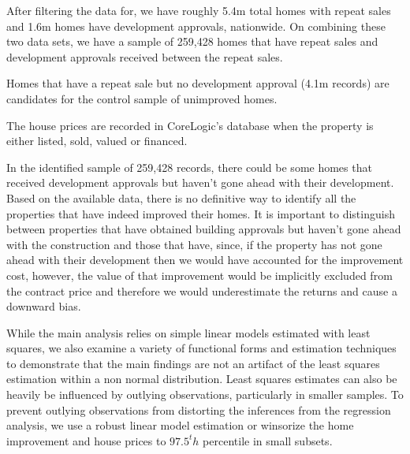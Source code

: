 %


After filtering the data for,   we have roughly 5.4m total homes with repeat sales and 1.6m homes have development approvals, nationwide. On combining these two data sets, we have a sample of 259,428 homes that have repeat sales and development approvals received between the repeat sales. 

Homes that have a repeat sale but no development approval (4.1m records) are candidates for the control sample of unimproved homes.


 The house prices are recorded in CoreLogic's database when the property is either listed, sold, valued or financed. 


In the identified sample of 259,428 records, there could be some homes that received development approvals but haven't gone ahead with their development. Based on the available data, there is no definitive way to identify all the properties that have indeed improved their homes. It is important to distinguish between properties that have obtained building approvals but haven't gone ahead with the construction and those that have, since, if the property has not gone ahead with their development then we would have accounted for the improvement cost, however, the value of that improvement would be implicitly excluded from the contract price and therefore we would underestimate the returns and cause a downward bias.




While the main analysis relies on simple linear models estimated with least squares, we also examine a variety of functional forms and estimation techniques to demonstrate that the main findings are not an artifact of the least squares estimation within a non normal distribution. Least squares estimates can also be heavily be influenced by outlying observations, particularly in smaller samples. To prevent outlying observations from distorting the inferences from the regression analysis, we use a robust linear model estimation or winsorize the home improvement and house prices to $97.5^th$ percentile in small subsets.




